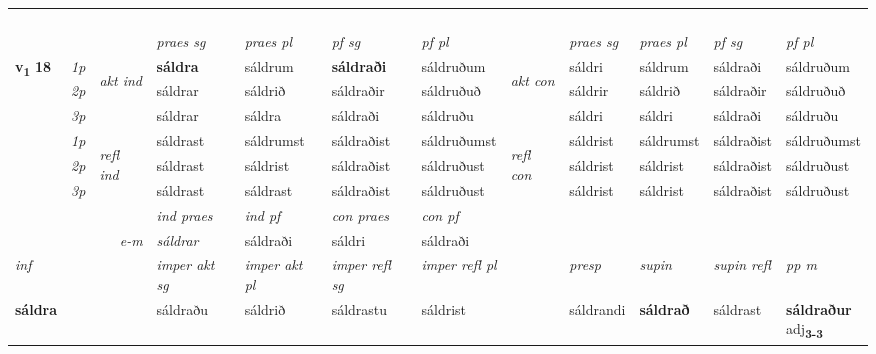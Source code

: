 \begin{longtable}[l]{X>{\footnotesize\itshape}llXXXXlXXXX}
\midrule
& \\*
 & \\*
   & \\*
  & \\
   \midrule
 & &   & \textit{praes sg}  & \textit{praes pl}    & \textit{ pf sg} & \textit{pf pl} & & \textit{praes sg}  & \textit{praes pl}    & \textit{pf sg} & \textit{pf pl }  \\ \cmidrule{4-7} \cmidrule{9-12}
 \multirow{2}{*}{{{\textbf{v{\textsubscript{1}}} \Large{\textbf{18}}}}}  & 1p & \multirow{3}{*}{\begin{turn}{90}\textit{akt ind}\end{turn}} & \textbf{sáldra} & sáldrum & \textbf{sáldraði} & sáldruðum & \multirow{3}{*}{\begin{turn}{90}\textit{akt con}\end{turn}} &sáldri & sáldrum & sáldraði & sáldruðum\\*
 & 2p &  &  sáldrar  & sáldrið & sáldraðir & sáldruðuð & & sáldrir & sáldrið & sáldraðir & sáldruðuð \\*
 & 3p &  & sáldrar & sáldra & sáldraði & sáldruðu & & sáldri & sáldri& sáldraði & sáldruðu \\*
\cmidrule{4-7} \cmidrule{9-12}
 & 1p & \multirow{3}{*}{\begin{turn}{90}\textit{refl ind}\end{turn}}  & sáldrast & sáldrumst & sáldraðist & sáldruðumst & \multirow{3}{*}{\begin{turn}{90}\textit{refl con}\end{turn}}  &sáldrist & sáldrumst & sáldraðist & sáldruðumst \\*
 & 2p &  & sáldrast & sáldrist & sáldraðist & sáldruðust & &sáldrist & sáldrist & sáldraðist & sáldruðust \\*
 & 3p  & & sáldrast & sáldrast & sáldraðist & sáldruðust & & sáldrist & sáldrist& sáldraðist & sáldruðust \\*
\cmidrule{4-7} \cmidrule{9-12}

   && &  \textit{ind praes} & \textit{ind pf} & \textit{con praes} & \textit{con pf} \\*
\multicolumn{3}{r}{\textit{e-m}} & sáldrar & sáldraði & sáldri & sáldraði \\*

\cmidrule{4-7}
   {\textit{inf}} & &  & \textit{imper akt sg} & \textit{imper akt pl} & \textit{imper refl sg} & \textit{imper refl pl} && \textit{presp} & \textit{supin} & \textit{supin refl} & \textit{pp m} \\*
  {\textbf{sáldra}} & && sáldraðu  & sáldrið & sáldrastu & sáldrist && sáldrandi &  \textbf{sáldrað} & sáldrast & \specialcell{\textbf{sáldraður} \\ adj\textbf{\textsubscript{3-3}}} \\*


\end{longtable}
